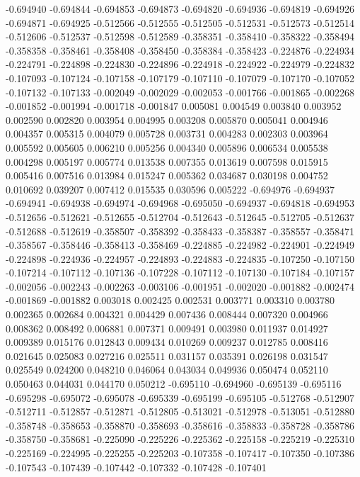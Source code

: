 -0.694940
-0.694844
-0.694853
-0.694873
-0.694820
-0.694936
-0.694819
-0.694926
-0.694871
-0.694925
-0.512566
-0.512555
-0.512505
-0.512531
-0.512573
-0.512514
-0.512606
-0.512537
-0.512598
-0.512589
-0.358351
-0.358410
-0.358322
-0.358494
-0.358358
-0.358461
-0.358408
-0.358450
-0.358384
-0.358423
-0.224876
-0.224934
-0.224791
-0.224898
-0.224830
-0.224896
-0.224918
-0.224922
-0.224979
-0.224832
-0.107093
-0.107124
-0.107158
-0.107179
-0.107110
-0.107079
-0.107170
-0.107052
-0.107132
-0.107133
-0.002049
-0.002029
-0.002053
-0.001766
-0.001865
-0.002268
-0.001852
-0.001994
-0.001718
-0.001847
0.005081
0.004549
0.003840
0.003952
0.002590
0.002820
0.003954
0.004995
0.003208
0.005870
0.005041
0.004946
0.004357
0.005315
0.004079
0.005728
0.003731
0.004283
0.002303
0.003964
0.005592
0.005605
0.006210
0.005256
0.004340
0.005896
0.006534
0.005538
0.004298
0.005197
0.005774
0.013538
0.007355
0.013619
0.007598
0.015915
0.005416
0.007516
0.013984
0.015247
0.005362
0.034687
0.030198
0.004752
0.010692
0.039207
0.007412
0.015535
0.030596
0.005222
-0.694976
-0.694937
-0.694941
-0.694938
-0.694974
-0.694968
-0.695050
-0.694937
-0.694818
-0.694953
-0.512656
-0.512621
-0.512655
-0.512704
-0.512643
-0.512645
-0.512705
-0.512637
-0.512688
-0.512619
-0.358507
-0.358392
-0.358433
-0.358387
-0.358557
-0.358471
-0.358567
-0.358446
-0.358413
-0.358469
-0.224885
-0.224982
-0.224901
-0.224949
-0.224898
-0.224936
-0.224957
-0.224893
-0.224883
-0.224835
-0.107250
-0.107150
-0.107214
-0.107112
-0.107136
-0.107228
-0.107112
-0.107130
-0.107184
-0.107157
-0.002056
-0.002243
-0.002263
-0.003106
-0.001951
-0.002020
-0.001882
-0.002474
-0.001869
-0.001882
0.003018
0.002425
0.002531
0.003771
0.003310
0.003780
0.002365
0.002684
0.004321
0.004429
0.007436
0.008444
0.007320
0.004966
0.008362
0.008492
0.006881
0.007371
0.009491
0.003980
0.011937
0.014927
0.009389
0.015176
0.012843
0.009434
0.010269
0.009237
0.012785
0.008416
0.021645
0.025083
0.027216
0.025511
0.031157
0.035391
0.026198
0.031547
0.025549
0.024200
0.048210
0.046064
0.043034
0.049936
0.050474
0.052110
0.050463
0.044031
0.044170
0.050212
-0.695110
-0.694960
-0.695139
-0.695116
-0.695298
-0.695072
-0.695078
-0.695339
-0.695199
-0.695105
-0.512768
-0.512907
-0.512711
-0.512857
-0.512871
-0.512805
-0.513021
-0.512978
-0.513051
-0.512880
-0.358748
-0.358653
-0.358870
-0.358693
-0.358616
-0.358833
-0.358728
-0.358786
-0.358750
-0.358681
-0.225090
-0.225226
-0.225362
-0.225158
-0.225219
-0.225310
-0.225169
-0.224995
-0.225255
-0.225203
-0.107358
-0.107417
-0.107350
-0.107386
-0.107543
-0.107439
-0.107442
-0.107332
-0.107428
-0.107401
